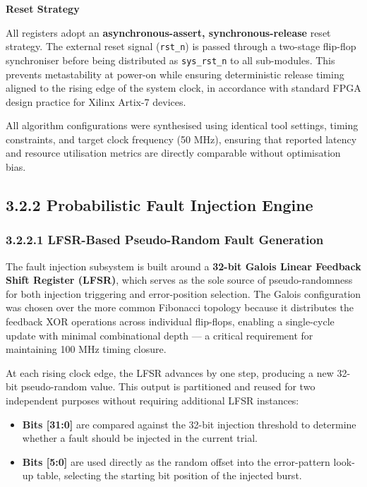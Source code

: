 \documentclass[
  english,
  12pt,
]{report}
\providecommand{\tightlist}{%
  \setlength{\itemsep}{0pt}\setlength{\parskip}{0pt}}
\begin{document}
\textbf{Reset Strategy}

All registers adopt an \textbf{asynchronous-assert, synchronous-release}
reset strategy. The external reset signal (\texttt{rst\_n}) is passed
through a two-stage flip-flop synchroniser before being distributed as
\texttt{sys\_rst\_n} to all sub-modules. This prevents metastability at
power-on while ensuring deterministic release timing aligned to the
rising edge of the system clock, in accordance with standard FPGA design
practice for Xilinx Artix-7 devices.

All algorithm configurations were synthesised using identical tool
settings, timing constraints, and target clock frequency (50 MHz),
ensuring that reported latency and resource utilisation metrics are
directly comparable without optimisation bias.

\subsection{3.2.2 Probabilistic Fault Injection
Engine}\label{probabilistic-fault-injection-engine}

\subsubsection{3.2.2.1 LFSR-Based Pseudo-Random Fault
Generation}\label{lfsr-based-pseudo-random-fault-generation}

The fault injection subsystem is built around a \textbf{32-bit Galois
Linear Feedback Shift Register (LFSR)}, which serves as the sole source
of pseudo-randomness for both injection triggering and error-position
selection. The Galois configuration was chosen over the more common
Fibonacci topology because it distributes the feedback XOR operations
across individual flip-flops, enabling a single-cycle update with
minimal combinational depth --- a critical requirement for maintaining
100 MHz timing closure.

At each rising clock edge, the LFSR advances by one step, producing a
new 32-bit pseudo-random value. This output is partitioned and reused
for two independent purposes without requiring additional LFSR
instances:

\begin{itemize}
\tightlist
\item
  \textbf{Bits {[}31:0{]}} are compared against the 32-bit injection
  threshold to determine whether a fault should be injected in the
  current trial.
\item
  \textbf{Bits {[}5:0{]}} are used directly as the random offset into
  the error-pattern look-up table, selecting the starting bit position
  of the injected burst.
\end{itemize}
\end{document}
